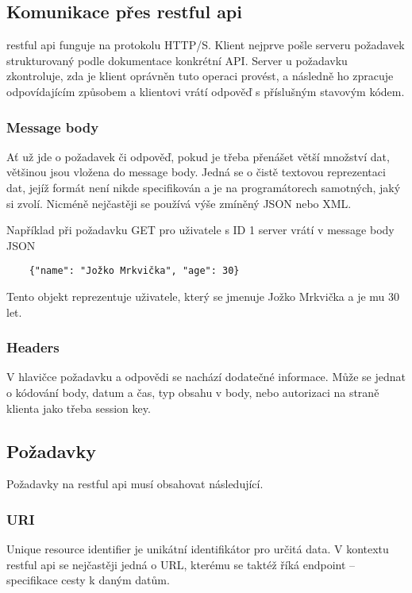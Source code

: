 \subsection{Komunikace přes \gls{restful api}} %
\gls{restful api} funguje na protokolu HTTP/S. Klient nejprve pošle serveru požadavek strukturovaný podle dokumentace konkrétní API. Server u požadavku zkontroluje, zda je klient oprávněn tuto operaci provést, a následně ho zpracuje odpovídajícím způsobem a klientovi vrátí odpověď s příslušným stavovým kódem.

\subsubsection*{Message body}
Ať už jde o požadavek či odpověď, pokud je třeba přenášet větší množství dat, většinou jsou vložena do message body. Jedná se o čistě textovou reprezentaci dat, jejíž formát není nikde specifikován a je na programátorech samotných, jaký si zvolí. Nicméně nejčastěji se používá výše zmíněný JSON nebo XML.

Například při požadavku GET pro uživatele s ID 1 server vrátí v message body JSON
\begin{verbatim}
	{"name": "Jožko Mrkvička", "age": 30}
\end{verbatim}
Tento objekt reprezentuje uživatele, který se jmenuje Jožko Mrkvička a je mu 30 let.

\subsubsection*{Headers}
V hlavičce požadavku a odpovědi se nachází dodatečné informace. Může se jednat o kódování body, datum a čas, typ obsahu v body, nebo autorizaci na straně klienta jako třeba session key.


\subsection{Požadavky}
Požadavky na \gls{restful api} musí obsahovat následující.

\subsubsection*{URI}
Unique resource identifier je unikátní identifikátor pro určitá data. V kontextu \gls{restful api} se nejčastěji jedná o URL, kterému se taktéž říká endpoint -- specifikace cesty k daným datům.

